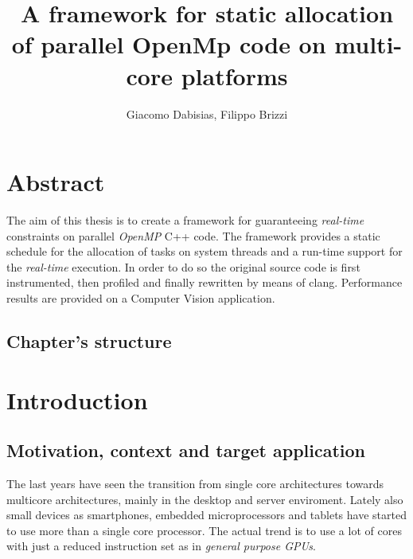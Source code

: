 \documentclass[a4paper,11pt,oneside]{book}
\author{Giacomo Dabisias, Filippo Brizzi}
\title{A framework for static allocation of parallel OpenMp code on multi-core platforms}
\begin{document}
\frontmatter
\tableofcontents

\chapter{Abstract}

The aim of this thesis is to create a framework for guaranteeing \emph{real-time} constraints on parallel \emph{OpenMP} C++ code. The framework provides a static schedule for the allocation of tasks on system threads and a run-time support for the \emph{real-time} execution. In order to do so the original source code is first instrumented, then profiled and finally rewritten by means of clang. Performance results are provided on a Computer Vision application.

\section{Chapter's structure}

\mainmatter
\chapter{Introduction}

\section{Motivation, context and target application}

The last years have seen the transition from single core architectures towards multicore architectures, mainly in the desktop and server enviroment. Lately also small devices as smartphones, embedded microprocessors and tablets have started to use more than a single core processor. The actual trend is to use a lot of cores with just a reduced instruction set as in \emph{general purpose GPUs}.
\end{document}
